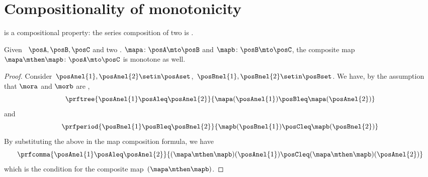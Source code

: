 
\section{Compositionality of monotonicity}
 is a compositional property: the series composition of two  is .
\begin{lemma}\label{lem:monotonicity-compositional}
    Given ~$\posA,\posB,\posC$ and two .
    $\mapa\colon \posA \mto \posB$ and $\mapb\colon \posB \mto \posC$, the composite map~$\mapa\mthen \mapb\colon \posA \mto \posC$ is monotone as well.
\end{lemma}
\begin{proof}
    Consider~$\posAnel{1},\posAnel{2} \setin \posAset$,~$\posBnel{1},\posBnel{2}\setin \posBset$.
    We have, by the assumption that $\mora$ and $\morb$ are ,
    \begin{equation}\label{eq:monotonicity-compositional-1}
        \prftree{\posAnel{1}\posAleq \posAnel{2}}{\mapa(\posAnel{1})\posBleq \mapa(\posAnel{2})}
    \end{equation}
    and
    \begin{equation}\label{eq:monotonicity-compositional-2}
        \prfperiod{\posBnel{1}\posBleq \posBnel{2}}{\mapb(\posBnel{1})\posCleq \mapb(\posBnel{2})}
    \end{equation}
    By substituting the above in the map composition formula, we have
    \begin{equation}\label{eq:monotonicity-compositional-3}
        \prfcomma{\posAnel{1}\posAleq \posAnel{2} }{ (\mapa\mthen \mapb)(\posAnel{1}) \posCleq (\mapa\mthen \mapb)(\posAnel{2})}
    \end{equation}
    which is the  condition for the composite map~$(\mapa\mthen\mapb)$.
\end{proof}

